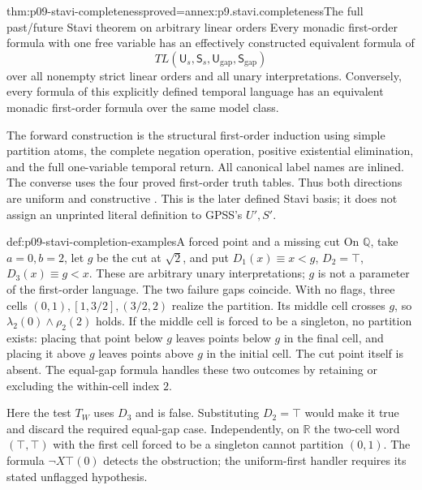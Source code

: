 \begin{hbtheorem}{thm:p09-stavi-completeness}{proved=annex:p9.stavi.completeness}{The full past/future Stavi theorem on arbitrary linear orders}
Every monadic first-order formula with
one free variable has an effectively
constructed equivalent formula of
\[
              TL(\mathsf U_s,\mathsf S_s,
                         \mathsf U_{\mathrm{gap}},\mathsf S_{\mathrm{gap}})
\]
over all nonempty strict linear orders
and all unary interpretations.
Conversely, every formula of this
explicitly defined temporal language
has an equivalent monadic first-order
formula over the same model class.

The forward construction is the structural
first-order induction using simple
partition atoms, the complete negation
operation, positive existential elimination,
and the full one-variable temporal return.
All canonical label names are inlined.
The converse uses the four proved
first-order truth tables. Thus both
directions are uniform and constructive
\cite[Theorems~2.3 and 4.4]{Rabinovich2018Stavi}.
This is the later defined Stavi basis;
it does not assign an unprinted literal
definition to GPSS's \(U',S'\).
\end{hbtheorem}

\begin{hbexample}{def:p09-stavi-completion-examples}{A forced point and a missing cut}
On \(\mathbb Q\), take \(a=0,b=2\), let \(g\)
be the cut at \(\sqrt2\), and put
\(D_1(x)\equiv x<g\), \(D_2=\top\),
\(D_3(x)\equiv g<x\). These are arbitrary
unary interpretations; \(g\) is not a
parameter of the first-order language.
The two failure gaps coincide. With
no flags, three cells
\((0,1),[1,3/2],(3/2,2)\) realize the
partition. Its middle cell crosses \(g\),
so \(\lambda_2(0)\land\rho_2(2)\) holds.
If the middle cell is forced to be
a singleton, no partition exists:
placing that point below \(g\) leaves
points below \(g\) in the final cell,
and placing it above \(g\) leaves
points above \(g\) in the initial cell.
The cut point itself is absent.
The equal-gap formula handles these
two outcomes by retaining or excluding
the within-cell index \(2\).

Here the test \(T_W\) uses \(D_3\)
and is false. Substituting \(D_2=\top\)
would make it true and discard the
required equal-gap case. Independently,
on \(\mathbb R\) the two-cell word
\((\top,\top)\) with the first cell
forced to be a singleton cannot
partition \((0,1)\). The formula
\(\neg X\top(0)\) detects the obstruction;
the uniform-first handler requires
its stated unflagged hypothesis.
\end{hbexample}
